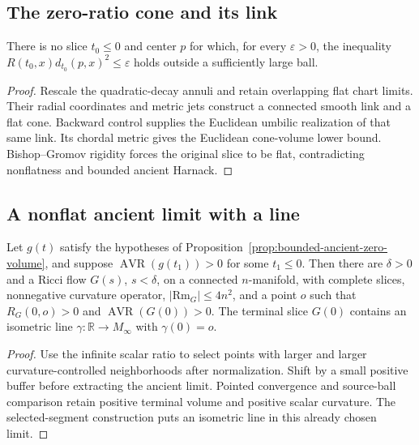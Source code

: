 \subsection{The zero-ratio cone and its link}

\begin{lemma}
\label{lem:ancient-zero-ratio-obstruction}
There is no slice $t_0\leq0$ and center $p$ for which, for every
$\varepsilon>0$, the inequality
$R(t_0,x)d_{t_0}(p,x)^2\leq\varepsilon$ holds outside a
sufficiently large ball.
\end{lemma}
\begin{proof}
Rescale the quadratic-decay annuli and retain overlapping flat chart limits.
Their radial coordinates and metric jets construct a connected smooth link and
a flat cone. Backward control supplies the Euclidean umbilic realization of
that same link. Its chordal metric gives the Euclidean cone-volume lower
bound. Bishop--Gromov rigidity forces the original slice to be flat,
contradicting nonflatness and bounded ancient Harnack.
\end{proof}

\subsection{A nonflat ancient limit with a line}

\begin{lemma}
\label{lem:ancient-selected-line}
Let $g(t)$ satisfy the hypotheses of
Proposition~\ref{prop:bounded-ancient-zero-volume}, and suppose
$\operatorname{AVR}(g(t_1))>0$ for some $t_1\leq0$.
Then there are $\delta>0$ and a Ricci flow $G(s)$, $s<\delta$,
on a connected $n$-manifold, with complete slices, nonnegative
curvature operator, $|\mathrm{Rm}_G|\leq4n^2$, and a point $o$
such that $R_G(0,o)>0$ and $\operatorname{AVR}(G(0))>0$.
The terminal slice $G(0)$ contains an isometric line
$\gamma:\mathbb R\to M_\infty$ with $\gamma(0)=o$.
\end{lemma}
\begin{proof}
Use the infinite scalar ratio to select points with larger and larger
curvature-controlled neighborhoods after normalization. Shift by a small
positive buffer before extracting the ancient limit. Pointed convergence and
source-ball comparison retain positive terminal volume and positive scalar
curvature. The selected-segment construction puts an isometric line in this
already chosen limit.
\end{proof}

